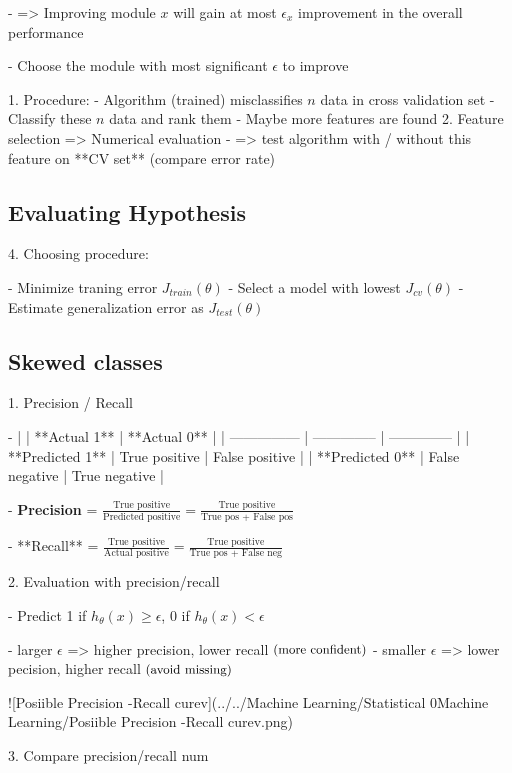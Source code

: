 - => Improving module $x$ will gain at most $\epsilon_x$ improvement in the overall performance

- Choose the module with most significant $\epsilon$ to improve


1. Procedure:
- Algorithm (trained) misclassifies $n$ data in cross validation set
- Classify these $n$ data and rank them
- Maybe more features are found
2. Feature selection => Numerical evaluation
- => test algorithm with / without this feature on **CV set** (compare error rate)

\subsection{Evaluating Hypothesis}


4. Choosing procedure:

- Minimize traning error $J_{train}(\theta)$ 
- Select a model with lowest $J_{cv}(\theta)$ 
- Estimate generalization error as $J_{test}(\theta)$ 


\subsection{Skewed classes}

1. Precision / Recall

- |                 | **Actual 1**   | **Actual 0**   |
| --------------- | -------------- | -------------- |
| **Predicted 1** | True positive  | False positive |
| **Predicted 0** | False negative | True negative  |

- \textbf{Precision} = $\displaystyle \frac{\text {True positive}}{\text{Predicted positive}} = \frac{\text {True positive}}{\text{True pos + False pos}}$

- **Recall** = $\displaystyle \frac{\text{True positive}}{\text{Actual positive}} = \frac{\text{True positive}}{\text{True pos + False neg}}$

2. Evaluation with precision/recall

- Predict 1 if $ h_\theta(x) \geq \epsilon$, 0 if $h_\theta(x) < \epsilon$

- larger $\epsilon$ => higher precision, lower recall $\small \text{(more confident)}$ 
- smaller $\epsilon$ => lower pecision, higher recall $\small \text{(avoid missing)}$       

![Posiible Precision -Recall curev](../../Machine Learning/Statistical 0Machine Learning/Posiible Precision -Recall curev.png)  

3. Compare precision/recall num

